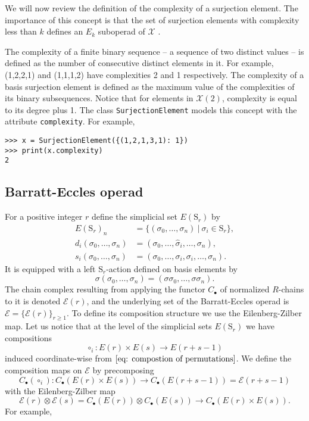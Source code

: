 \documentclass{amsart}
\renewcommand{\S}{\mathrm{S}}
\newcommand{\chains}{C_\bullet}
\begin{document}
We will now review the definition of the complexity of a surjection element.
The importance of this concept is that the set of surjection elements with complexity less than $k$ defines an $E_k$ suboperad of $\mathcal X$ \cite{McClureSmith03}.

The complexity of a finite binary sequence -- a sequence of two distinct values -- is defined as the number of consecutive distinct elements in it.
For example, (1,2,2,1) and (1,1,1,2) have complexities 2 and 1 respectively.
The complexity of a basis surjection element is defined as the maximum value of the complexities of its binary subsequences.
Notice that for elements in $\mathcal X(2)$, complexity is equal to its degree plus 1.
The class \texttt{SurjectionElement} models this concept with the attribute \texttt{complexity}.
For example,

\begin{Verbatim}[frame=lines, samepage=true]
>>> x = SurjectionElement({(1,2,1,3,1): 1})
>>> print(x.complexity)
2
\end{Verbatim}

\subsection{Barratt-Eccles operad}

For a positive integer $r$ define the simplicial set $E(\S_r)$ by
\begin{align*}
E(\S_r)_n &= \{ (\sigma_0, \dots, \sigma_n)\ |\ \sigma_i \in \S_r\}, \\
d_i(\sigma_0, \dots, \sigma_n) &= (\sigma_0, \dots, \widehat{\sigma}_i, \dots, \sigma_n), \\
s_i(\sigma_0, \dots, \sigma_n) &= (\sigma_0, \dots, \sigma_i, \sigma_i, \dots, \sigma_n).
\end{align*}
It is equipped with a left $\S_r$-action defined on basis elements by
\begin{equation*}
\sigma (\sigma_0, \dots, \sigma_n) = (\sigma \sigma_0, \dots, \sigma \sigma_n).
\end{equation*}
The chain complex resulting from applying the functor $\chains$ of normalized $R$-chains to it is denoted $\mathcal E(r)$, and the underlying set of the Barratt-Eccles operad is $\mathcal E = \{\mathcal E(r)\}_{r \geq 1}$.
To define its composition structure we use the Eilenberg-Zilber map.
Let us notice that at the level of the simplicial sets $E(\S_r)$ we have compositions
\begin{equation*}
\circ_i \colon E(r) \times E(s) \to E(r + s - 1)
\end{equation*}
induced coordinate-wise from $\eqref{eq: compostion of permutations}$.
We define the composition maps on $\mathcal E$ by precomposing
\begin{equation*}
\chains(\circ_i) \colon \chains(E(r) \times E(s))
\longrightarrow
\chains(E(r + s - 1)) = \mathcal E(r+s-1)
\end{equation*}
with the Eilenberg-Zilber map
\begin{equation*}
\mathcal E(r) \otimes \mathcal E(s) =
\chains(E(r)) \otimes \chains(E(s))
\longrightarrow
\chains(E(r) \times E(s)).
\end{equation*}
For example,
\end{document}
